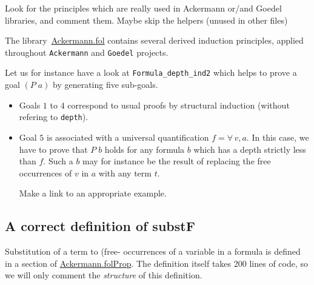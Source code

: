 



\begin{todo}
 Look for the principles which are really used in Ackermann or/and Goedel libraries, and comment them.
 Maybe skip the helpers (unused in other files)
\end{todo}

The library~\href{../theories/html/hydras.Ackermann.fol.html}{Ackermann.fol} contains several derived induction principles, applied 
throughout \texttt{Ackermann} and \texttt{Goedel} projects.


Let us for instance have a look  at \texttt{Formula\_depth\_ind2} which helps  to prove a goal $(P\;a)$ by generating five sub-goals.


\begin{itemize}
\item Goals $1$ to $4$ correspond to  usual proofs by structural induction (without refering to \texttt{depth}).
\item Goal $5$ is associated with a universal quantification $f=\forall\,v,a$. In this case, we have to prove that $P\;b$ holds for any formula $b$ which has a depth strictly less than $f$. Such a $b$ may for instance be the result of replacing the free occurrences of $v$ in $a$ with any term $t$.
  
  \begin{todo}
   Make a link to an appropriate example.
  \end{todo}
\end{itemize}



\subsection{A correct definition of substF}

Substitution of a term to (free- occurrences of a variable 
in a formula is defined in a section of \href{../theories/html/hydras.Ackermann.folProp.html}{Ackermann.folProp}.
The definition itself takes 200 lines of \coq code, so we will only comment the \emph{structure} of this definition.

